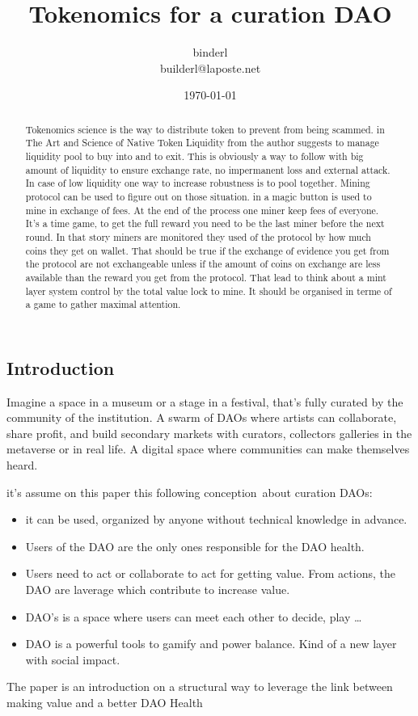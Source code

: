 \documentclass{article}
\title{Tokenomics for a curation DAO}
\author{binderl\\
builderl@laposte.net\\}
\date{\today}
\begin{document}
\pagestyle{myheadings}

\maketitle

\begin{multicols}{2}[]

\begin{abstract}
	Tokenomics science is the way to distribute token to prevent from being scammed. in The Art and Science of Native Token Liquidity from \cite{eva} the author suggests to manage liquidity pool to buy into and to exit. This is obviously a way to follow with big amount of liquidity to ensure exchange rate, no impermanent loss and external attack. In case of low liquidity one way to increase robustness is to pool together. Mining protocol can be used to figure out on those situation. in \cite{qtz:UchArb} a magic button is used to mine in exchange of fees. At the end of the process one miner keep fees of everyone. It's a time game, to get the full reward you need to be the last miner before the next round. In that story miners are monitored they used of the protocol by how much coins they get on wallet. That should be true if the exchange of evidence you get from the protocol are not exchangeable unless if the amount of coins on exchange are less available than the reward you get from the protocol. That lead to think about a mint layer system control by the total value lock to mine. It should be organised in terme of a game to gather maximal attention.

\end{abstract}

\section{Introduction}
Imagine a space in a museum or a stage in a festival, that’s fully curated by the community of the institution. A swarm of DAOs where artists can collaborate, share profit, and build secondary markets with curators, collectors galleries in the metaverse or in real life. A digital space where communities can make themselves heard.

it's assume on this paper this following conception about curation DAOs:
\begin{itemize}
	\item it can be used, organized by anyone without technical knowledge in advance.
   \item Users of the DAO are the only ones responsible for the DAO health.
   \item Users need to act or collaborate to act for getting value. From actions, the DAO are laverage which contribute to increase value.
   \item DAO’s is a space where users can meet each other to decide, play …
   \item DAO is a powerful tools to gamify and power balance. Kind of a new layer with social impact. 
\end{itemize}      
The paper is an introduction on a structural way to leverage the link between making value  and a better DAO Health


\end{multicols}
\end{document}
